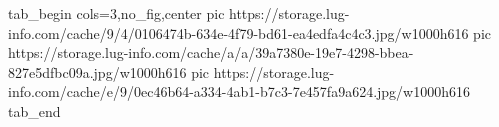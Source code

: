  
 
 
 
 

\ifcmt
  tab_begin cols=3,no_fig,center
     pic https://storage.lug-info.com/cache/9/4/0106474b-634e-4f79-bd61-ea4edfa4c4c3.jpg/w1000h616%
		 pic https://storage.lug-info.com/cache/a/a/39a7380e-19e7-4298-bbea-827e5dfbc09a.jpg/w1000h616%
		 pic https://storage.lug-info.com/cache/e/9/0ec46b64-a334-4ab1-b7c3-7e457fa9a624.jpg/w1000h616%
  tab_end
\fi
